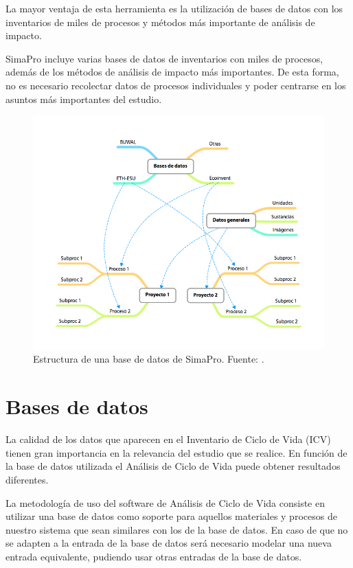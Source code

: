 La mayor ventaja de esta herramienta es la utilización de bases de datos con los inventarios de miles de procesos y métodos más importante de análisis de impacto.

SimaPro incluye varias bases de datos de inventarios con miles de procesos, además de los métodos de análisis de impacto más importantes. De esta forma, no es necesario recolectar datos de procesos individuales y poder centrarse en los asuntos más importantes del estudio.

\begin{figure}[!htb]
\centering
\includegraphics[width=15cm]{img/bbddsimapro.png}
\caption[Estructura de una base de datos de SimaPro.]{Estructura de una base de datos de SimaPro. Fuente: \protect\cite{mgoedkoop3}.}
\label{fig:bbddsimapro}
\end{figure}

\section{Bases de datos}

La calidad de los datos que aparecen en el Inventario de Ciclo de Vida (ICV) tienen gran importancia en la relevancia del estudio que se realice. En función de la base de datos utilizada el Análisis de Ciclo de Vida puede obtener resultados diferentes.

La metodología de uso del software de Análisis de Ciclo de Vida consiste en utilizar una base de datos como soporte para aquellos materiales y procesos de nuestro sistema que sean similares con los de la base de datos. En caso de que no se adapten a la entrada de la base de datos será necesario modelar una nueva entrada equivalente, pudiendo usar otras entradas de la base de datos.

